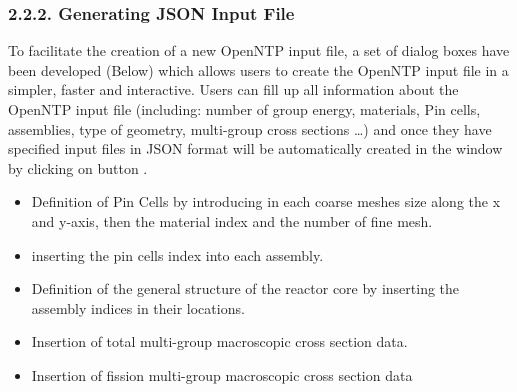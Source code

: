 \documentclass[letterpaper,10pt,english]{sphinxmanual}
\begin{document}
\subsubsection{2.2.2. Generating JSON Input File}
\label{\detokenize{Guide:generating-json-input-file}}
To facilitate the creation of a new OpenNTP input file, a set of dialog boxes have been developed (Below) which allows users to create the OpenNTP input file in a simpler, faster and interactive. Users can fill up all information about the OpenNTP input file (including: number of group energy, materials, Pin cells, assemblies, type of geometry, multi-group cross sections …) and once they have specified input files in JSON format will be automatically created in the window  by clicking on button .
\begin{itemize}
\item {} 
Definition of Pin Cells by introducing in each coarse meshes size along the x and y-axis, then the material index and the number of fine mesh.

\end{itemize}

\noindent{}
\begin{itemize}
\item {} 
inserting the pin cells index into each assembly.

\end{itemize}

\noindent{}
\begin{itemize}
\item {} 
Definition of the general structure of the reactor core by inserting the assembly indices in their locations.

\end{itemize}

\noindent{}
\begin{itemize}
\item {} 
Insertion of total multi-group macroscopic cross section data.

\end{itemize}

\noindent{}
\begin{itemize}
\item {} 
Insertion of fission  multi-group macroscopic cross section data

\end{itemize}
\end{document}
